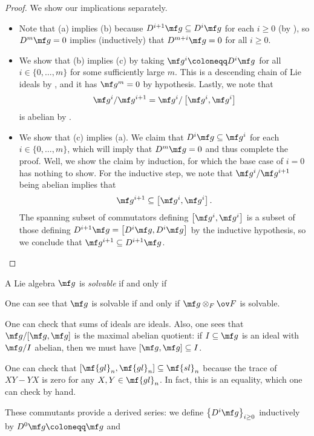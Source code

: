 \documentclass[../notes.tex]{subfiles}
\begin{document}
\begin{proof}
	We show our implications separately.
	\begin{itemize}
		\item Note that (a) implies (b) because $D^{i+1}\mf g\subseteq D^i\mf g$ for each $i\ge0$ (by ), so $D^m\mf g=0$ implies (inductively) that $D^{m+i}\mf g=0$ for all $i\ge0$.
		\item We show that (b) implies (c) by taking $\mf g^i\coloneqq D^i\mf g$ for all $i\in\{0,\ldots,m\}$ for some sufficiently large $m$. This is a descending chain of Lie ideals by , and it has $\mf g^m=0$ by hypothesis. Lastly, we note that
		\[\mf g^i/\mf g^{i+1}=\mf g^i/\left[\mf g^i,\mf g^i\right]\]
		is abelian by .
		\item We show that (c) implies (a). We claim that $D^i\mf g\subseteq\mf g^i$ for each $i\in\{0,\ldots,m\}$, which will imply that $D^m\mf g=0$ and thus complete the proof. Well, we show the claim by induction, for which the base case of $i=0$ has nothing to show. For the inductive step, we note that $\mf g^i/\mf g^{i+1}$ being abelian implies that
		\[\mf g^{i+1}\subseteq\left[\mf g^i,\mf g^i\right].\]
		The spanning subset of commutators defining $\left[\mf g^i,\mf g^i\right]$ is a subset of those defining $D^{i+1}\mf g=\left[D^i\mf g,D^i\mf g\right]$ by the inductive hypothesis, so we conclude that $\mf g^{i+1}\subseteq D^{i+1}\mf g$.
		\qedhere
	\end{itemize}
\end{proof}
\begin{definition}[solvable]
	A Lie algebra $\mf g$ is \textit{solvable} if and only if 
\end{definition}
\begin{remark}
	One can see that $\mf g$ is solvable if and only if $\mf g\otimes_F\ov F$ is solvable.
\end{remark}
One can check that sums of ideals are ideals. Also, one sees that $\mf g/[\mf g,\mf g]$ is the maximal abelian quotient: if $I\subseteq\mf g$ is an ideal with $\mf g/I$ abelian, then we must have $[\mf g,\mf g]\subseteq I$.
\begin{example}
	One can check that $[\mf{gl}_n,\mf{gl}_n]\subseteq\mf{sl}_n$ because the trace of $XY-YX$ is zero for any $X,Y\in\mf{gl}_n$. In fact, this is an equality, which one can check by hand.
\end{example}
These commutants provide a derived series: we define $\left\{D^i\mf g\right\}_{i\ge0}$ inductively by $D^0\mf g\coloneqq\mf g$ and
\end{document}
